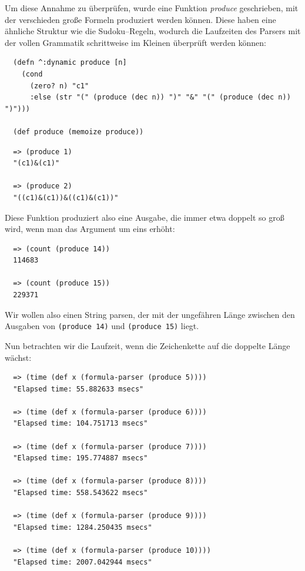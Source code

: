 \documentclass[ngerman,a4paper,abstracton,open=right,twoside=false,toc=listofnumbered,bibtotocnumbered]{scrreprt}
\begin{document}
Um diese Annahme zu überprüfen, wurde eine Funktion \emph{produce} geschrieben, mit der verschieden große Formeln produziert werden können. Diese haben eine ähnliche Struktur wie die Sudoku--Regeln, wodurch die Laufzeiten des Parsers mit der vollen Grammatik schrittweise im Kleinen überprüft werden können:

\begin{lstlisting}
  (defn ^:dynamic produce [n]
    (cond
      (zero? n) "c1"
      :else (str "(" (produce (dec n)) ")" "&" "(" (produce (dec n)) ")")))

  (def produce (memoize produce))
\end{lstlisting}

\begin{lstlisting}
  => (produce 1)
  "(c1)&(c1)"

  => (produce 2)
  "((c1)&(c1))&((c1)&(c1))"
\end{lstlisting}

Diese Funktion produziert also eine Ausgabe, die immer etwa doppelt so groß wird, wenn man das Argument um eins erhöht:

\begin{lstlisting}
  => (count (produce 14))
  114683

  => (count (produce 15))
  229371
\end{lstlisting}

Wir wollen also einen String parsen, der mit der ungefähren Länge zwischen den Ausgaben von \lstinline|(produce 14)| und \lstinline|(produce 15)| liegt.

Nun betrachten wir die Laufzeit, wenn die Zeichenkette auf die doppelte Länge wächst:

\begin{lstlisting}
  => (time (def x (formula-parser (produce 5))))
  "Elapsed time: 55.882633 msecs"

  => (time (def x (formula-parser (produce 6))))
  "Elapsed time: 104.751713 msecs"

  => (time (def x (formula-parser (produce 7))))
  "Elapsed time: 195.774887 msecs"

  => (time (def x (formula-parser (produce 8))))
  "Elapsed time: 558.543622 msecs"

  => (time (def x (formula-parser (produce 9))))
  "Elapsed time: 1284.250435 msecs"

  => (time (def x (formula-parser (produce 10))))
  "Elapsed time: 2007.042944 msecs"
\end{lstlisting}
\end{document}
